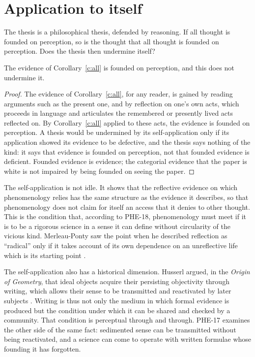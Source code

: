 \documentclass{situationist-preprint}
\begin{document}
\section{Application to itself}

The thesis is a philosophical thesis, defended by reasoning. If all thought is founded on perception, so is the thought that all thought is founded on perception. Does the thesis then undermine itself?

\begin{proposition}\label{p:self}
The evidence of Corollary~\ref{c:all} is founded on perception, and this does not undermine it.
\end{proposition}

\begin{proof}
The evidence of Corollary~\ref{c:all}, for any reader, is gained by reading arguments such as the present one, and by reflection on one's own acts, which proceeds in language and articulates the remembered or presently lived acts reflected on. By Corollary~\ref{c:all} applied to these acts, the evidence is founded on perception. A thesis would be undermined by its self-application only if its application showed its evidence to be defective, and the thesis says nothing of the kind: it says that evidence is founded on perception, not that founded evidence is deficient. Founded evidence is evidence; the categorial evidence that the paper is white is not impaired by being founded on seeing the paper.
\end{proof}

The self-application is not idle. It shows that the reflective evidence on which phenomenology relies has the same structure as the evidence it describes, so that phenomenology does not claim for itself an access that it denies to other thought. This is the condition that, according to PHE-18, phenomenology must meet if it is to be a rigorous science in a sense it can define without circularity of the vicious kind. Merleau-Ponty saw the point when he described reflection as \enquote{radical} only if it takes account of its own dependence on an unreflective life which is its starting point \citep[Preface]{MerleauPonty1945}.

The self-application also has a historical dimension. Husserl argued, in the \emph{Origin of Geometry}, that ideal objects acquire their persisting objectivity through writing, which allows their sense to be transmitted and reactivated by later subjects \citep{Husserl1939b}. Writing is thus not only the medium in which formal evidence is produced but the condition under which it can be shared and checked by a community. That condition is perceptual through and through. PHE-17 examines the other side of the same fact: sedimented sense can be transmitted without being reactivated, and a science can come to operate with written formulae whose founding it has forgotten.
\end{document}
